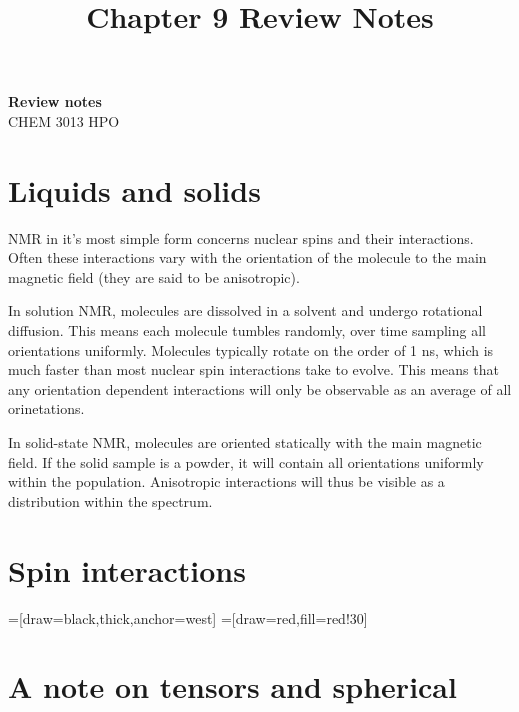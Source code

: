 \documentclass[11pt]{article}
\theoremstyle{definition}
\begin{document}
\title{Chapter 9 Review Notes}

\thispagestyle{empty}

\begin{center}
{\LARGE \bf Review notes}\\
{\large CHEM 3013 HPO}\\
\end{center}

\tableofcontents


\newpage
\section{Liquids and solids}
NMR in it's most simple form concerns nuclear spins and their interactions. Often these interactions vary with the orientation of the molecule to the main magnetic field (they are said to be anisotropic). 

In solution NMR, molecules are dissolved in a solvent and undergo rotational diffusion. This means each molecule tumbles randomly, over time sampling all orientations uniformly. Molecules typically rotate on the order of 1 ns, which is much faster than most nuclear spin interactions take to evolve. This means that any orientation dependent interactions will only be observable as an average of all orinetations.

In solid-state NMR, molecules are oriented statically with the main magnetic field. If the solid sample is a powder, it will contain all orientations uniformly within the population. Anisotropic interactions will thus be visible as a distribution within the spectrum.



\section{Spin interactions}

=[draw=black,thick,anchor=west]
=[draw=red,fill=red!30]




\section{A note on tensors and spherical}
\end{document}
